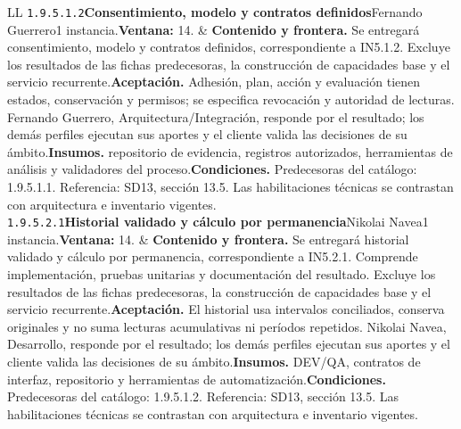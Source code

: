 \begin{longtable}{L{\tabcolsep\relax}L{\tabcolsep\relax}}
\texttt{1.\allowbreak{}9.\allowbreak{}5.\allowbreak{}1.\allowbreak{}2}\newline{}\textbf{Consentimiento, modelo y contratos definidos}\newline{}Fernando Guerrero\newline{}1 instancia.\newline{}\textbf{Ventana:} 14. & \textbf{Contenido y frontera.} Se entregará consentimiento, modelo y contratos definidos, correspondiente a IN5.1.2. Excluye los resultados de las fichas predecesoras, la construcción de capacidades base y el servicio recurrente.\newline{}\textbf{Aceptación.} Adhesión, plan, acción y evaluación tienen estados, conservación y permisos; se especifica revocación y autoridad de lecturas. Fernando Guerrero, Arquitectura/Integración, responde por el resultado; los demás perfiles ejecutan sus aportes y el cliente valida las decisiones de su ámbito.\newline{}\textbf{Insumos.} repositorio de evidencia, registros autorizados, herramientas de análisis y validadores del proceso.\newline{}\textbf{Condiciones.} Predecesoras del catálogo: 1.9.5.1.1. Referencia: SD13, sección 13.5. Las habilitaciones técnicas se contrastan con arquitectura e inventario vigentes.\\\hline
\texttt{1.\allowbreak{}9.\allowbreak{}5.\allowbreak{}2.\allowbreak{}1}\newline{}\textbf{Historial validado y cálculo por permanencia}\newline{}Nikolai Navea\newline{}1 instancia.\newline{}\textbf{Ventana:} 14. & \textbf{Contenido y frontera.} Se entregará historial validado y cálculo por permanencia, correspondiente a IN5.2.1. Comprende implementación, pruebas unitarias y documentación del resultado. Excluye los resultados de las fichas predecesoras, la construcción de capacidades base y el servicio recurrente.\newline{}\textbf{Aceptación.} El historial usa intervalos conciliados, conserva originales y no suma lecturas acumulativas ni períodos repetidos. Nikolai Navea, Desarrollo, responde por el resultado; los demás perfiles ejecutan sus aportes y el cliente valida las decisiones de su ámbito.\newline{}\textbf{Insumos.} DEV/QA, contratos de interfaz, repositorio y herramientas de automatización.\newline{}\textbf{Condiciones.} Predecesoras del catálogo: 1.9.5.1.2. Referencia: SD13, sección 13.5. Las habilitaciones técnicas se contrastan con arquitectura e inventario vigentes.\\\hline

\end{longtable}
